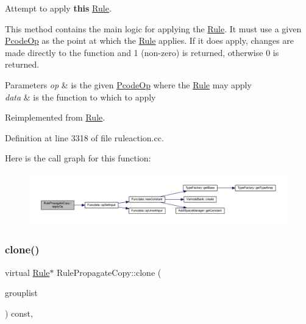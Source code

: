Attempt to apply {\bfseries{this}} \mbox{\hyperlink{class_rule}{Rule}}. 

This method contains the main logic for applying the \mbox{\hyperlink{class_rule}{Rule}}. It must use a given \mbox{\hyperlink{class_pcode_op}{Pcode\+Op}} as the point at which the \mbox{\hyperlink{class_rule}{Rule}} applies. If it does apply, changes are made directly to the function and 1 (non-\/zero) is returned, otherwise 0 is returned. 
\begin{DoxyParams}{Parameters}
{\em op} & is the given \mbox{\hyperlink{class_pcode_op}{Pcode\+Op}} where the \mbox{\hyperlink{class_rule}{Rule}} may apply \\
\hline
{\em data} & is the function to which to apply \\
\hline
\end{DoxyParams}


Reimplemented from \mbox{\hyperlink{class_rule_a4e3e61f066670175009f60fb9dc60848}{Rule}}.



Definition at line 3318 of file ruleaction.\+cc.

Here is the call graph for this function\+:
\nopagebreak
\begin{figure}[H]
\begin{center}
\leavevmode
\includegraphics[width=350pt]{class_rule_propagate_copy_a4204e280e01206f9de2f082afffdce81_cgraph}
\end{center}
\end{figure}
\mbox{\label{class_rule_propagate_copy_adcaeff563b266b1410a3a69038a8ba71}} 
\subsubsection{\texorpdfstring{clone()}{clone()}}
{\footnotesize\ttfamily virtual \mbox{\hyperlink{class_rule}{Rule}}$\ast$ Rule\+Propagate\+Copy\+::clone (\begin{DoxyParamCaption}\item[{const \mbox{\hyperlink{class_action_group_list}{Action\+Group\+List}} \&}]{grouplist }\end{DoxyParamCaption}) const\hspace{0.3cm}{\ttfamily [inline]}, {\ttfamily [virtual]}}



